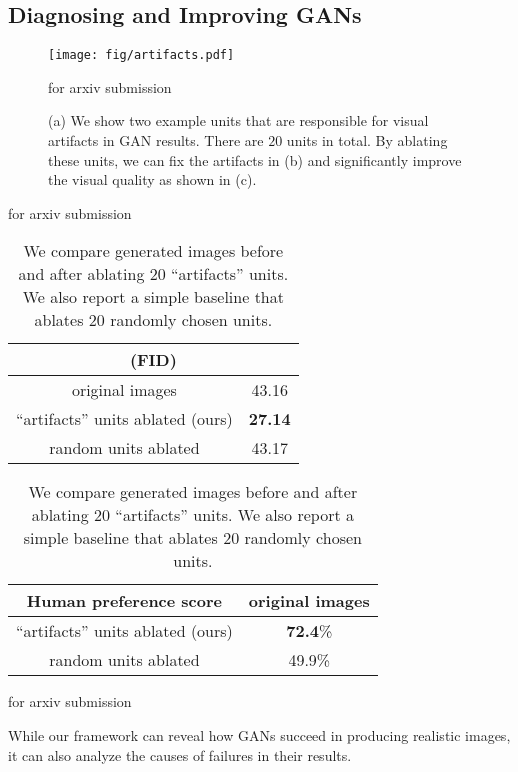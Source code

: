 \documentclass{article} %
\def\arxiv{for arxiv submission}
\begin{document}
\subsection{Diagnosing and Improving GANs}\begin{figure}[t]
\texttt{[image: fig/artifacts.pdf]}
\vspace{-20pt}
\caption{(a) We show two example  units that are responsible for visual artifacts in GAN results. There are $20$ units in total. By ablating these units,  we can fix the artifacts in (b) and significantly improve the visual quality as shown in (c).}
\ifdefined\arxiv
\vspace{-10pt}
\else
\vspace{-5pt}
\fi
\end{figure}\begin{table}[t]
	\small
\ifdefined\arxiv
	\vspace{-20pt}
	\else
	\fi
	\centering
	\caption{We compare generated images before and after ablating $20$ ``artifacts'' units. We also report a simple baseline that ablates $20$ randomly chosen units.}
		\vspace{-5pt}

	\begin{tabularx}{175pt}{cc}
		\toprule
	 \multicolumn{2}{c}{\fid (FID)}	\tabularnewline\midrule
original images		  & 43.16    	\tabularnewline
		``artifacts'' units ablated (ours)		  & {\bf 27.14}   		\tabularnewline
		random units ablated      & 43.17
		\tabularnewline\bottomrule
	\end{tabularx}\quad
	\begin{tabularx}{210pt}{cc}
		\toprule
		Human preference score  & original images  \tabularnewline\midrule
		``artifacts'' units ablated (ours) 	  & {\bf 72.4}\% \tabularnewline
		random units ablated   &  49.9\%
		\tabularnewline\bottomrule
	\end{tabularx}
    \ifdefined\arxiv

    \else
    \vspace{-10pt}
    \fi
\end{table}
While our framework can reveal how GANs succeed in producing realistic images, it can also analyze the causes of failures in their results. %
\end{document}
